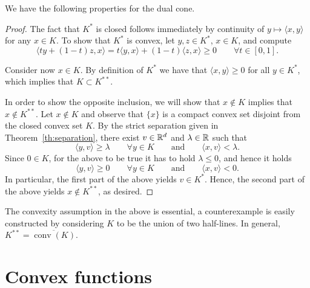  We have the following properties for the dual cone.
 
 
 \begin{proof}
     The fact that $K^*$ is closed follows immediately by continuity of $y\mapsto \langle x,y\rangle$ for any $x\in K$.
     To show that $K^*$ is convex, let $y,z\in K^*$, $x\in K$, and compute
     \begin{equation}
         \langle ty + (1-t)z, x\rangle = t \langle y, x\rangle +(1-t) \langle z,x\rangle \ge 0 \qquad \forall t\in [0,1].
     \end{equation}
 
     Consider now $x\in K$. By definition of $K^*$ we have that $\langle x,y\rangle\ge 0$ for all $y\in K^*$, which implies that $K\subset K^{**}$.
 
     In order to show the opposite inclusion, we will show that $x\notin K$ implies that $x\notin K^{**}$. Let $x\notin K$ and observe that $\{x\}$ is a compact convex set disjoint from the closed convex set $K$. By the strict separation given in Theorem~\ref{th:separation}, there exist $v\in \mathbb{R}^d$ and $\lambda\in\mathbb{R}$ such that
     \begin{equation}
         \langle y,v \rangle\ge  \lambda\qquad \forall y\in K
         \qquad\text{and}\qquad
         \langle x,v \rangle < \lambda.
     \end{equation}
     Since $0\in K$, for the above to be true it has to hold $\lambda \le 0$, and hence it holds
     \begin{equation}
         \langle y,v \rangle\ge  0\qquad \forall y\in K
         \qquad\text{and}\qquad
         \langle x,v \rangle < 0.
     \end{equation}
     In particular, the first part of the above yields $v\in K^*$. Hence, the second part of the above yields $x\notin K^{**}$, as desired.
 \end{proof}
 
 \begin{remark}
     The convexity assumption in the above is essential, a counterexample is easily constructed by considering $K$ to be the union of two half-lines.
     In general, $K^{**} = \overline{\operatorname{conv}(K)}$.
 \end{remark}
 
 \section{Convex functions}
 
